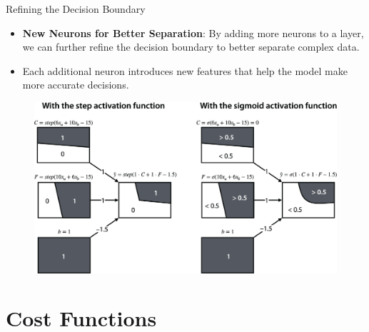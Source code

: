 \documentclass[serif, aspectratio=169]{beamer}
\begin{document}
\begin{frame}{Refining the Decision Boundary}
    \begin{itemize}
        \item \justifying \textbf{New Neurons for Better Separation}:
        By adding more neurons to a layer, we can further refine the decision boundary to better separate complex data.
        \item \justifying Each additional neuron introduces new features that help the model make more accurate decisions.
    \end{itemize}
    \begin{figure}
        \centering
        \includegraphics[width=0.53\linewidth]{pic/Figure_22.png}
    \end{figure}
    \vfill
\end{frame}


\section{Cost Functions}
\end{document}
